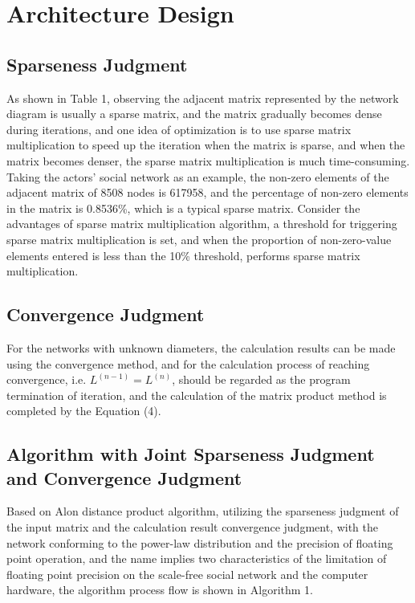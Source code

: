 \documentclass[review]{cvpr}
\begin{document}
\section{Architecture Design}

\subsection{Sparseness Judgment}

As shown in Table 1, observing the adjacent matrix represented by the network diagram is usually a sparse matrix, and the matrix gradually becomes dense during iterations,
and one idea of optimization is to use sparse matrix multiplication to speed up the iteration when the matrix is sparse, and when the matrix becomes denser, the sparse matrix multiplication is much time-consuming.
Taking the actors' social network as an example, the non-zero elements of the adjacent matrix of 8508 nodes is 617958, and the percentage of non-zero elements in the matrix is 0.8536\%, which is a typical sparse matrix.
Consider the advantages of sparse matrix multiplication algorithm, a threshold for triggering sparse matrix multiplication is set,
and when the proportion of non-zero-value elements entered is less than the 10\% threshold, performs sparse matrix multiplication.

\subsection{Convergence Judgment}

For the networks with unknown diameters, the calculation results can be made using the convergence method, and for the calculation process of reaching convergence,
i.e. $L^{(n-1)}=L^{(n)}$, should be regarded as the program termination of iteration, and the calculation of the matrix product method is completed by the Equation (4).

\subsection{Algorithm with Joint Sparseness Judgment and Convergence Judgment}

Based on Alon \etal distance product algorithm, utilizing the sparseness judgment of the input matrix and the calculation result convergence judgment,
with the network conforming to the power-law distribution and the precision of floating point operation, and the name implies two characteristics of the limitation
of floating point precision on the scale-free social network and the computer hardware, the algorithm process flow is shown in Algorithm 1.
\end{document}
